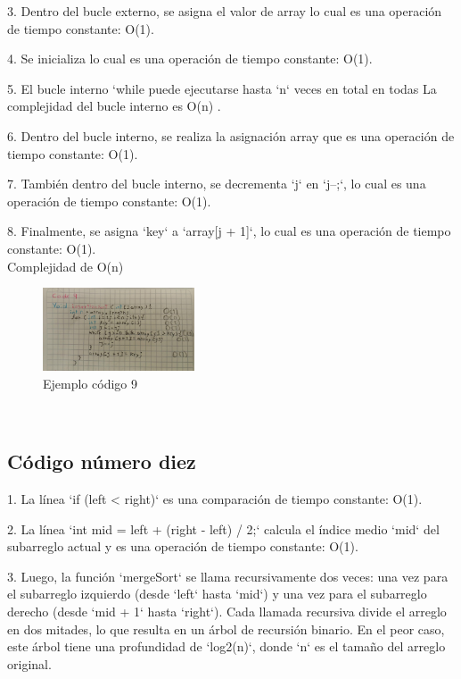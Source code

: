 \documentclass[journal, spanish]{IEEEtran}
\begin{document}
3. Dentro del bucle externo, se asigna el valor de array lo cual es una operación de tiempo constante: O(1).

4. Se inicializa  lo cual es una operación de tiempo constante: O(1).

5. El bucle interno `while  puede ejecutarse hasta `n` veces en total en todas La complejidad del bucle interno es O(n) .

6. Dentro del bucle interno, se realiza la asignación array que es una operación de tiempo constante: O(1).

7. También dentro del bucle interno, se decrementa `j` en `j--;`, lo cual es una operación de tiempo constante: O(1).

8. Finalmente, se asigna `key` a `array[j + 1]`, lo cual es una operación de tiempo constante: O(1).\\


Complejidad de O(n)\\


\begin{figure}[H]
  \centering
  \includegraphics[width=0.4\textwidth]{WhatsApp Image 2023-09-11 at 8.01.42 PM.jpeg}
  \caption{Ejemplo código 9}
  \label{fig:imagen1}
  
  
\end{figure}\\

\subsection{Código número diez}
1. La línea `if (left < right)` es una comparación de tiempo constante: O(1).

2. La línea `int mid = left + (right - left) / 2;` calcula el índice medio `mid` del subarreglo actual y es una operación de tiempo constante: O(1).

3. Luego, la función `mergeSort` se llama recursivamente dos veces: una vez para el subarreglo izquierdo (desde `left` hasta `mid`) y una vez para el subarreglo derecho (desde `mid + 1` hasta `right`). Cada llamada recursiva divide el arreglo en dos mitades, lo que resulta en un árbol de recursión binario. En el peor caso, este árbol tiene una profundidad de `log2(n)`, donde `n` es el tamaño del arreglo original.
\end{document}

